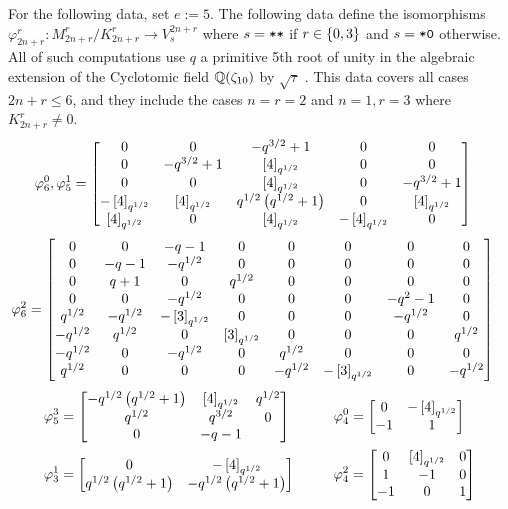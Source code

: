\documentclass{amsart}
\begin{document}
For the following data, set $e := 5$.
The following data define the isomorphisms $\varphi_{2n + r}^r: M_{2n + r}^r / K_{2n + r}^r \rightarrow V_{s}^{2n + r}$ where $s = \texttt{*}\texttt{*}$ if $r \in \left\{ 0,3 \right\}$ and $s = \texttt{*}\texttt{0}$ otherwise.
All of such computations use $q$ a primitive 5th root of unity in the algebraic extension of the Cyclotomic field $\mathbb{Q}(\zeta_{10})$ by $\sqrt\tau$ \cite{Github}.
This data covers all cases $2n + r \leq 6$, and they include the cases $n = r = 2$ and $n = 1, r = 3$ where $K_{2n + r}^r \neq 0$.
\def\tho{q^{3/2} + 1}
\def\tht{\brk{4}_{q^{1/2}}}
\def\to{q^{1/2}\prn{q^{1/2} + 1}}
\begin{align*}
  \varphi_6^0, \varphi_5^1 &= \begin{bmatrix}
    0 & 0 & -\tho & 0 & 0\\
    0 & -\tho & \tht & 0 & 0\\
    0 & 0 & \tht & 0 & -\tho\\
    -\tht & \tht & \to & 0 & \tht\\
    \tht & 0 & \tht & -\tht & 0
  \end{bmatrix}
\end{align*}
\begin{align*}
  \varphi_6^2 &= \begin{bmatrix}
    0 & 0 & - q - 1 & 0 & 0 & 0 & 0 & 0\\
    0 & -q - 1 & -q^{1/2} & 0 & 0 & 0 & 0 & 0\\
    0 & q + 1 & 0 & q^{1/2} & 0 & 0 & 0 & 0\\
    0 & 0 & -q^{1/2} & 0 & 0 & 0 & -q^2 - 1 & 0\\
    q^{1/2} & -q^{1/2} & -\left[ 3 \right]_{q^{1/2}} & 0 & 0 & 0 & -q^{1/2} & 0\\
   -q^{1/2} & q^{1/2} & 0 & \left[ 3 \right]_{q^{1/2}} &0 & 0 & 0 & q^{1/2}\\
   -q^{1/2} & 0 & -q^{1/2} & 0 & q^{1/2} & 0 & 0 & 0\\
    q^{1/2} & 0 & 0 & 0 & -q^{1/2} & -\left[ 3 \right]_{q^{1/2}} & 0 & -q^{1/2}
  \end{bmatrix}
\end{align*}
\begin{align*}
  \varphi_5^3 &= \begin{bmatrix}
    -\to & \tht & q^{1/2}\\
    q^{1/2} & q^{3/2} & 0\\
    0 & -q - 1
  \end{bmatrix}  \hspace{30pt} 
  \varphi_4^0 = \begin{bmatrix}
      0 & -\tht\\
    -1 & 1
  \end{bmatrix}\\
  \varphi_3^1 &= \begin{bmatrix}
    0 & -\tht\\
    \to & -\to
  \end{bmatrix} \hspace{27pt}
  \varphi_4^2 = \begin{bmatrix}
    0 & \tht & 0\\
    1 & -1 & 0\\
    -1 & 0 & 1
  \end{bmatrix}
\end{align*}
\end{document}

